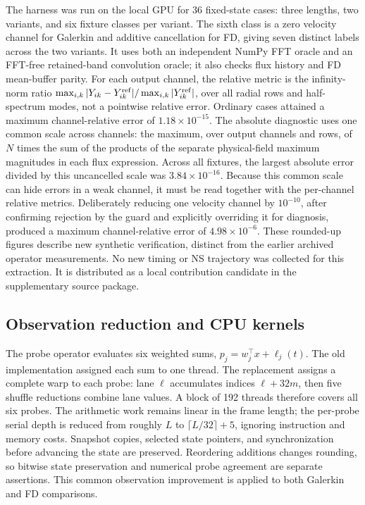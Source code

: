 The harness was run on the local GPU for 36 fixed-state cases: three lengths, two variants, and six fixture classes per variant. The sixth class is a zero velocity channel for Galerkin and additive cancellation for FD, giving seven distinct labels across the two variants. It uses both an independent NumPy FFT oracle and an FFT-free retained-band convolution oracle; it also checks flux history and FD mean-buffer parity. For each output channel, the relative metric is the infinity-norm ratio \(\max_{i,k}|Y_{ik}-Y^{\rm ref}_{ik}|/\max_{i,k}|Y^{\rm ref}_{ik}|\), over all radial rows and half-spectrum modes, not a pointwise relative error. Ordinary cases attained a maximum channel-relative error of \(1.18\times10^{-15}\). The absolute diagnostic uses one common scale across channels: the maximum, over output channels and rows, of \(N\) times the sum of the products of the separate physical-field maximum magnitudes in each flux expression. Across all fixtures, the largest absolute error divided by this uncancelled scale was \(3.84\times10^{-16}\). Because this common scale can hide errors in a weak channel, it must be read together with the per-channel relative metrics. Deliberately reducing one velocity channel by \(10^{-10}\), after confirming rejection by the guard and explicitly overriding it for diagnosis, produced a maximum channel-relative error of \(4.98\times10^{-6}\). These rounded-up figures describe new synthetic verification, distinct from the earlier archived operator measurements. No new timing or NS trajectory was collected for this extraction. It is distributed as a local contribution candidate in the supplementary source package.

\subsection{Observation reduction and CPU kernels}

The probe operator evaluates six weighted sums, \(p_j=w_j^\top x+\ell_j(t)\). The old implementation assigned each sum to one thread. The replacement assigns a complete warp to each probe: lane \(\ell\) accumulates indices \(\ell+32m\), then five shuffle reductions combine lane values\cite{r18}. A block of 192 threads therefore covers all six probes. The arithmetic work remains linear in the frame length; the per-probe serial depth is reduced from roughly \(L\) to \(\lceil L/32\rceil+5\), ignoring instruction and memory costs. Snapshot copies, selected state pointers, and synchronization before advancing the state are preserved. Reordering additions changes rounding, so bitwise state preservation and numerical probe agreement are separate assertions. This common observation improvement is applied to both Galerkin and FD comparisons.

